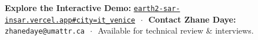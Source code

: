 \documentclass[10pt,letterpaper]{article}
\begin{document}
\vspace{-2pt}

\begin{tcolorbox}[colframe=catalystdark,colback=catalystdark,coltext=white,boxrule=0pt,top=4pt,bottom=4pt]
\centering\footnotesize
\textbf{Explore the Interactive Demo:} \href{https://earth2-sar-insar.vercel.app#city=it_venice&preset=sar_focus&stage=v3}{\texttt{earth2-sar-insar.vercel.app\#city=it\_venice}} $\,\cdot\,$ 
\textbf{Contact Zhane Daye:} \texttt{zhanedaye@umattr.ca} $\,\cdot\,$ Available for technical review \& interviews.
\end{tcolorbox}
\end{document}
